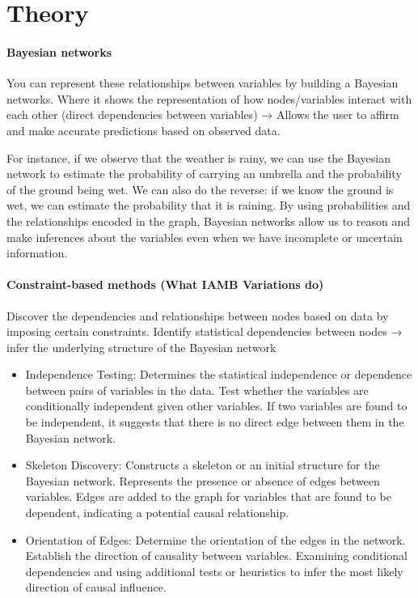 \documentclass{article}
\begin{document}
\section{Theory}
\paragraph{Bayesian networks}
You can represent these relationships between variables by building a Bayesian networks.
Where it shows the representation of how nodes/variables interact with each other (direct dependencies between variables) → Allows the user to affirm and make accurate predictions based on observed data. 

For instance, if we observe that the weather is rainy, we can use the Bayesian network to estimate the probability of carrying an umbrella and the probability of the ground being wet. We can also do the reverse: if we know the ground is wet, we can estimate the probability that it is raining.
By using probabilities and the relationships encoded in the graph, Bayesian networks allow us to reason and make inferences about the variables even when we have incomplete or uncertain information.

\paragraph{Constraint-based methods (What IAMB Variations do)}
Discover the dependencies and relationships between nodes based on data by imposing certain constraints. Identify statistical dependencies between nodes → infer the underlying structure of the Bayesian network
\begin{itemize}
  \item Independence Testing: Determines the statistical independence or dependence between pairs of variables in the data. 
  Test whether the variables are conditionally independent given other variables. 
  If two variables are found to be independent, it suggests that there is no direct edge between them in the Bayesian network.
  
  \item Skeleton Discovery: Constructs a skeleton or an initial structure for the Bayesian network. 
  Represents the presence or absence of edges between variables. 
  Edges are added to the graph for variables that are found to be dependent, indicating a potential causal relationship.
   
  \item Orientation of Edges: Determine the orientation of the edges in the network.
  Establish the direction of causality between variables. 
  Examining conditional dependencies and using additional tests or heuristics to infer the most likely direction of causal influence.  
\end{itemize}
\end{document}
